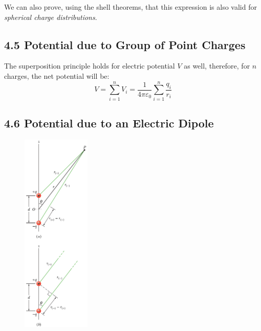 \documentclass[12pt, a4paper]{article}
\begin{document}
		We can also prove, using the shell theorems, that this expression is also valid for \textit{spherical charge distributions}.



		\subsection*{4.5 Potential due to Group of Point Charges}

		The superposition principle holds for electric potential $V$ as well, therefore, for $n$ charges, the net potential will be: 
		\begin{equation*}
			V = \sum_{i=1}^{n} V_i 
			  = \frac{1}{4 \pi \varepsilon_0} \sum_{i=1}^{n} \frac{q_i}{r_i}
			  \tag{Potential due to $n$ point charges, 4-19}
		\end{equation*}



		\subsection*{4.6 Potential due to an Electric Dipole}

		\begin{figure}
			\centering
			\includegraphics[width=3.25cm]{Physics2_PNGs/dipole-point-potential.png}
			\caption*{}
			\label{fig:dipole-point-potential.png}
		\end{figure}
\end{document}
